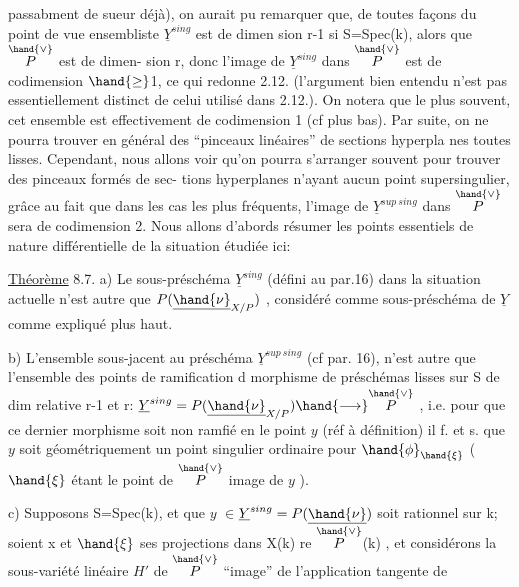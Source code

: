 
passabment de sueur déjà), on aurait pu remarquer que,  de
toutes façons du point de vue ensembliste $\underline{Y}^{sing}$ est de dimen%
sion r-1  si S=Spec(k), alors que $\overset{\hand{\vee}}{P}$ est de dimen-%
sion r, donc l'image de $\underline{Y}^{sing}$ dans $\overset{\hand{\vee}}{P}$ est de codimension $\hand{\geq}$1, ce qui redonne
2.12. (l'argument bien entendu n'est pas essentiellement distinct de
celui utilisé dans 2.12.). On notera que le plus souvent, cet ensemble
est effectivement de codimension 1 (cf plus bas). Par suite, on ne
pourra trouver en général des ``pinceaux linéaires'' de sections hyperpla%
nes toutes   lisses. Cependant, nous allons voir qu'on
pourra s'arranger souvent pour  trouver des pinceaux formés de sec-%
tions hyperplanes n'ayant aucun point supersingulier, grâce au fait que
dans les cas les plus fréquents, l'image de $\underline{Y}^{sup\ sing}$ dans $\overset{\hand{\vee}}{P}$ sera de
codimension 2. Nous allons d'abords résumer les points essentiels
de nature différentielle de la situation étudiée ici:

\uline{Théorème} 8.7. a) Le sous-préschéma $\underline{Y}^{sing}$ (défini au par.16) dans
la situation actuelle n'est autre que $P(\underline{\hand{\nu}}_{X/P})$ , considéré comme
sous-préschéma de $\underline{Y}$ comme expliqué plus haut.

b) L'ensemble sous-jacent au préschéma $\underline{Y}^{sup\ sing}$ (cf par. 16), 
 n'est autre que l'ensemble des points de ramification d morphisme de préschémas lisses sur S de dim relative r-1 et r:
$\underline{Y}^{sing} = P(\underline{\hand{\nu}}_{X/P}) \hand{\longrightarrow} \overset{\hand{\vee}}{P}$ , i.e. pour que ce dernier morphisme soit
non ramfié en le point $y$ (réf à définition) il f. et s. que $y$
soit géométriquement un point singulier ordinaire pour $\hand{\phi}_{\hand{\xi}}$ ($\hand{\xi}$ étant le
point de $\overset{\hand{\vee}}{P}$ image de $y$ ).

c) Supposons S=Spec(k), et que $y$ $\in$$\underline{Y}^{sing} = P(\underline{\hand{\nu}})$ soit rationnel sur k; soient x
et $\hand{\xi}$ ses projections dans X(k) re $\overset{\hand{\vee}}{P}$(k) , et considérons la 
sous-variété linéaire $H'$ de $\overset{\hand{\vee}}{P}$ ``image'' de l'application tangente de

